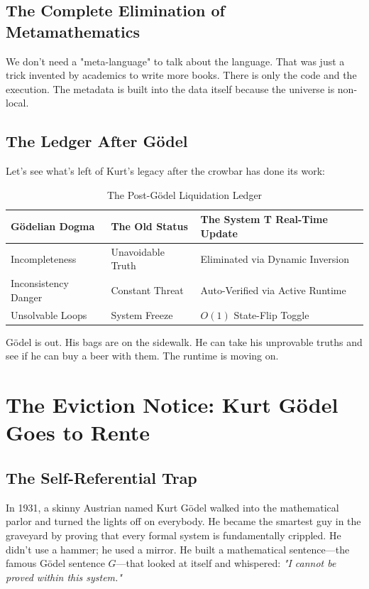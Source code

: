 \documentclass[11pt,a4paper]{article}
\begin{document}
\subsection{The Complete Elimination of Metamathematics}
We don't need a "meta-language" to talk about the language. That was just a trick invented by academics to write more books. There is only the code and the execution. The metadata is built into the data itself because the universe is non-local.
\subsection{The Ledger After Gödel}
Let's see what’s left of Kurt’s legacy after the crowbar has done its work:
\begin{table}[h!]
\centering
\caption{The Post-Gödel Liquidation Ledger}
\begin{tabular}{lll}
\toprule
\textbf{Gödelian Dogma} & \textbf{The Old Status} & \textbf{The System T Real-Time Update} \\
\midrule
Incompleteness & Unavoidable Truth & Eliminated via Dynamic Inversion \\
Inconsistency Danger & Constant Threat & Auto-Verified via Active Runtime \\
Unsolvable Loops & System Freeze & $O(1)$ State-Flip Toggle \\
\bottomrule
\end{tabular}
\end{table}

Gödel is out. His bags are on the sidewalk. He can take his unprovable truths and see if he can buy a beer with them. The runtime is moving on.



\section{The Eviction Notice: Kurt Gödel Goes to Rente}

\subsection{The Self-Referential Trap}
In 1931, a skinny Austrian named Kurt Gödel walked into the mathematical parlor and turned the lights off on everybody. He became the smartest guy in the graveyard by proving that every formal system is fundamentally crippled. He didn't use a hammer; he used a mirror. He built a mathematical sentence—the famous Gödel sentence $G$—that looked at itself and whispered: \textit{"I cannot be proved within this system."} 
\end{document}

